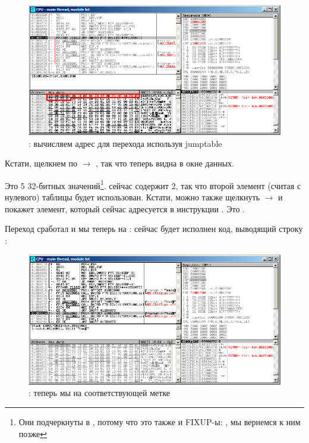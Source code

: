 \begin{figure}[H]
\centering
\includegraphics[scale=\FigScale]{patterns/08_switch/2_lot/olly3.png}
\caption{\olly: вычисляем адрес для перехода используя jumptable}
\label{fig:switch_lot_olly3}
\end{figure}

Кстати, щелкнем по  $\rightarrow$ , так что теперь  видна в окне данных.

Это 5 32-битных значений\footnote{Они подчеркнуты в \olly, потому что это также и FIXUP-ы: , мы вернемся к ним позже}.
\ECX сейчас содержит 2, так что второй элемент (считая с нулевого) таблицы будет использован.
Кстати, можно также щелкнуть  $\rightarrow$  и \olly покажет элемент, который сейчас адресуется в инструкции \JMP. 
Это .

\clearpage
Переход сработал и мы теперь на : сейчас будет исполнен код, выводящий строку :

\begin{figure}[H]
\centering
\includegraphics[scale=\FigScale]{patterns/08_switch/2_lot/olly4.png}
\caption{\olly: теперь мы на соответствующей метке }
\label{fig:switch_lot_olly4}
\end{figure}
